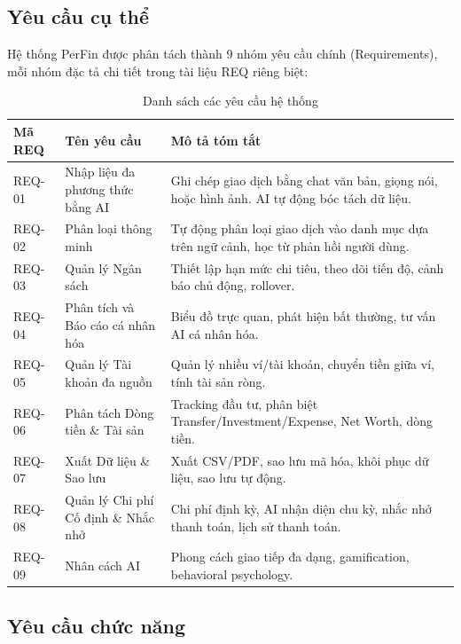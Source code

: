 \subsection{Yêu cầu cụ thể}
\label{subsec:specific_requirements}

Hệ thống PerFin được phân tách thành 9 nhóm yêu cầu chính (Requirements), mỗi nhóm đặc tả chi tiết trong tài liệu REQ riêng biệt:

\begin{table}[htbp]
\centering
\begin{tabularx}{\textwidth}{|l|l|X|}
\hline
\textbf{Mã REQ} & \textbf{Tên yêu cầu} & \textbf{Mô tả tóm tắt} \\ \hline
REQ-01 & Nhập liệu đa phương thức bằng AI & Ghi chép giao dịch bằng chat văn bản, giọng nói, hoặc hình ảnh. AI tự động bóc tách dữ liệu. \\ \hline
REQ-02 & Phân loại thông minh & Tự động phân loại giao dịch vào danh mục dựa trên ngữ cảnh, học từ phản hồi người dùng. \\ \hline
REQ-03 & Quản lý Ngân sách & Thiết lập hạn mức chi tiêu, theo dõi tiến độ, cảnh báo chủ động, rollover. \\ \hline
REQ-04 & Phân tích và Báo cáo cá nhân hóa & Biểu đồ trực quan, phát hiện bất thường, tư vấn AI cá nhân hóa. \\ \hline
REQ-05 & Quản lý Tài khoản đa nguồn & Quản lý nhiều ví/tài khoản, chuyển tiền giữa ví, tính tài sản ròng. \\ \hline
REQ-06 & Phân tách Dòng tiền \& Tài sản & Tracking đầu tư, phân biệt Transfer/Investment/Expense, Net Worth, dòng tiền. \\ \hline
REQ-07 & Xuất Dữ liệu \& Sao lưu & Xuất CSV/PDF, sao lưu mã hóa, khôi phục dữ liệu, sao lưu tự động. \\ \hline
REQ-08 & Quản lý Chi phí Cố định \& Nhắc nhở & Chi phí định kỳ, AI nhận diện chu kỳ, nhắc nhở thanh toán, lịch sử thanh toán. \\ \hline
REQ-09 & Nhân cách AI & Phong cách giao tiếp đa dạng, gamification, behavioral psychology. \\ \hline
\end{tabularx}
\caption{Danh sách các yêu cầu hệ thống}
\label{tab:requirements}
\end{table}

\subsection{Yêu cầu chức năng}
\label{subsec:functional_requirements}

